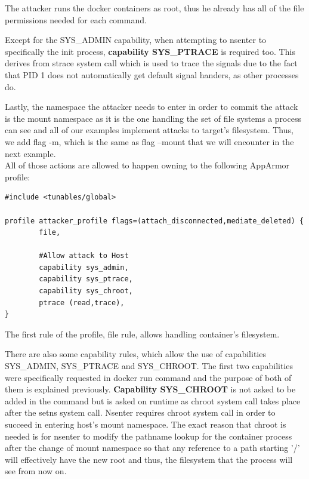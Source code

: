 The attacker runs the docker containers as root, thus he already has all of the file permissions needed for each command.

Except for the SYS\_ADMIN capability, when attempting to nsenter to specifically the init process, \textbf{capability SYS\_PTRACE} is required too. This derives from strace system call which is used to trace the signals due to the fact that PID 1 does not automatically get default signal handers, as other processes do.

Lastly, the namespace the attacker needs to enter in order to commit the attack is the mount namespace as it is the one handling the set of file systems a process can see and all of our examples implement attacks to target's filesystem. Thus, we add flag -m, which is the same as flag --mount that we will encounter in the next example.
\\
All of those actions are allowed to happen owning to the following AppArmor profile:

\begin{lstlisting}[style=Dockerfile, caption={AppArmor profile attacker\_profile}]
#include <tunables/global>

profile attacker_profile flags=(attach_disconnected,mediate_deleted) {
        file, 

        #Allow attack to Host
        capability sys_admin,
        capability sys_ptrace,
        capability sys_chroot,
        ptrace (read,trace),
}
\end{lstlisting}

The first rule of the profile, file rule, allows handling container's filesystem.

There are also some capability rules, which allow the use of capabilities SYS\_ADMIN, SYS\_PTRACE and SYS\_CHROOT. The first two capabilities were specifically requested in docker run command and the purpose of both of them is explained previously. \textbf{Capability SYS\_CHROOT} is not asked to be added in the command but is asked on runtime as chroot system call takes place after the setns system call. Nsenter requires chroot system call in order to succeed in entering host's mount namespace. The exact reason that chroot is needed is for nsenter to modify the pathname lookup for the container process after the change of mount namespace so that any reference to a path starting '/' will effectively have the new root and thus, the filesystem that the process will see from now on. 

